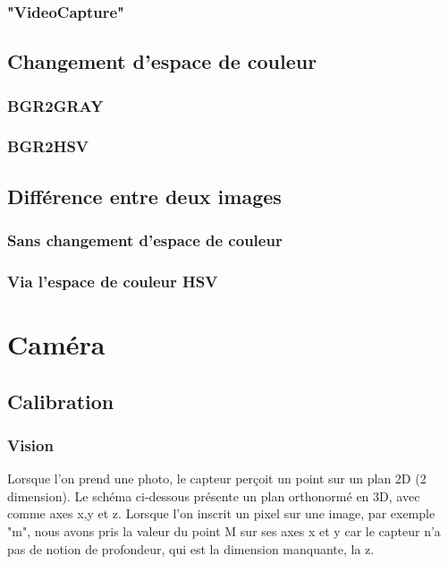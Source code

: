 \documentclass[12pt, french]{report}
\begin{document}
                
                \subsubsection{"VideoCapture"}
        \subsection{Changement d'espace de couleur}
                \subsubsection{BGR2GRAY}
                \subsubsection{BGR2HSV}
        \subsection{Différence entre deux images}
                \subsubsection{Sans changement d'espace de couleur}
                \subsubsection{Via l'espace de couleur HSV}

\section{Caméra}
\subsection{Calibration}
\subsubsection{Vision}
Lorsque l'on prend une photo, le capteur perçoit un point sur un plan 2D (2 dimension). Le schéma ci-dessous présente un plan orthonormé en 3D, avec comme axes x,y et z. Lorsque l'on inscrit un pixel sur une image, par exemple "m", nous avons pris la valeur du point M sur ses axes x et y car le capteur n'a pas de notion de profondeur, qui est la dimension manquante, la z.
\end{document}
